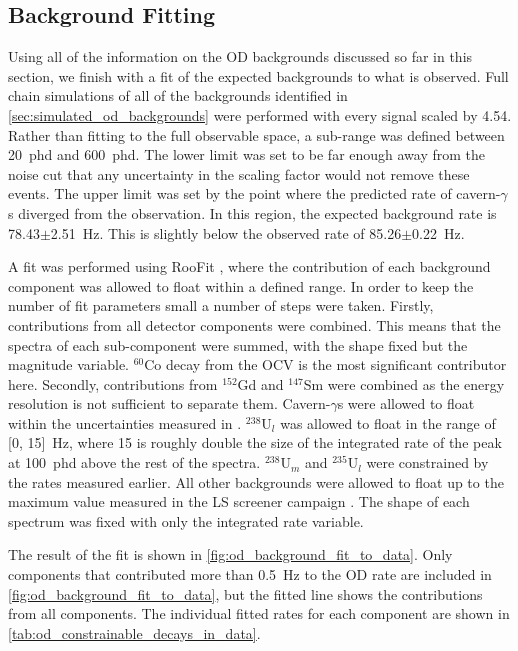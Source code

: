 \subsection{Background Fitting}
\par
Using all of the information on the OD backgrounds discussed so far in this section, we finish with a fit of the expected backgrounds to what is observed.
Full chain simulations of all of the backgrounds identified in \autoref{sec:simulated_od_backgrounds} were performed with every signal scaled by 4.54.
Rather than fitting to the full observable space, a sub-range was defined between 20~phd and 600~phd.
The lower limit was set to be far enough away from the noise cut that any uncertainty in the scaling factor would not remove these events.
The upper limit was set by the point where the predicted rate of cavern-$\gamma$s diverged from the observation.
In this region, the expected background rate is 78.43$\pm$2.51~Hz.
This is slightly below the observed rate of 85.26$\pm$0.22~Hz.
\par
A fit was performed using RooFit \cite{roostats_ref}, where the contribution of each background component was allowed to float within a defined range.
In order to keep the number of fit parameters small a number of steps were taken.
Firstly, contributions from all detector components were combined.
This means that the spectra of each sub-component were summed, with the shape fixed but the magnitude variable.
${}^{60}$Co decay from the OCV is the most significant contributor here.
Secondly, contributions from ${}^{152}$Gd and ${}^{147}$Sm were combined as the energy resolution is not sufficient to separate them.
Cavern-$\gamma$s were allowed to float within the uncertainties measured in \cite{LZ_Gamma_Ray_Background_ref}.
${}^{238}$U$_l$ was allowed to float in the range of [0, 15]~Hz, where 15 is roughly double the size of the integrated rate of the peak at 100~phd above the rest of the spectra.
${}^{238}$U$_{m}$ and ${}^{235}$U$_{l}$ were constrained by the rates measured earlier.
All other backgrounds were allowed to float up to the maximum value measured in the LS screener campaign \cite{scotthaselschwardt_thesis_ref}.
The shape of each spectrum was fixed with only the integrated rate variable.
\par
The result of the fit is shown in \autoref{fig:od_background_fit_to_data}.
Only components that contributed more than 0.5~Hz to the OD rate are included in \autoref{fig:od_background_fit_to_data}, but the fitted line shows the contributions from all components.
The individual fitted rates for each component are shown in \autoref{tab:od_constrainable_decays_in_data}.

